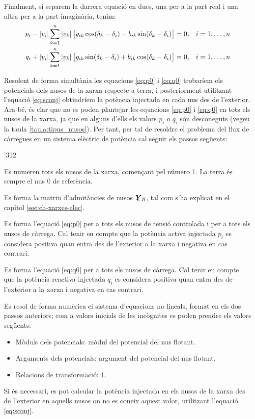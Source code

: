 Finalment, si separem la darrera equació en dues, una per a  la part real i  una altra per
a la part imaginària, tenim:
\begin{align}
    p_i - |\cmplx{v}_i| \sum^n_{k=1}  |\cmplx{v}_k|\, \bigl[ g_{ik} \cos(\delta_k - \delta_i) -
     b_{ik} \sin(\delta_k - \delta_i) \bigr] &= 0,  & i&=1,\ldots,n\label{eq:p0} \\
    q_i + |\cmplx{v}_i| \sum^n_{k=1}  |\cmplx{v}_k| \,\bigl[ g_{ik} \sin(\delta_k - \delta_i) +
      b_{ik} \cos(\delta_k - \delta_i) \bigr] &= 0, & i&=1,\ldots,n\label{eq:q0}
\end{align}

Resolent de forma simultània les equacions \eqref{eq:p0} i
\eqref{eq:q0} trobaríem els potencials dels nusos de la xarxa
respecte a  terra, i posteriorment utilitzant l'equació
\eqref{eq:sconj} obtindríem la potència injectada en cada nus des
de l'exterior. Ara bé, és clar que no es poden plantejar les
equacions \eqref{eq:p0} i \eqref{eq:q0} en tots els nusos de la
xarxa, ja que en alguns d'ells els valors $p_i$ o $q_i$ són
desconeguts (vegeu la taula \vref{taula:tipus_nusos}). Per tant, per
tal de resoldre el problema del flux de càrregues en un sistema
elèctric de potència cal seguir els passos següents:
\begin{dingautolist}{'312}
    \item Es numeren tots els nusos de la xarxa, començant pel número 1. La terra és sempre el nus 0 de referència.
   \item Es forma la matriu d'admitàncies de nusos $\mcmplx{Y}\ped{N}$, tal com s'ha
   explicat en el capítol \ref{sec:ch-xarxes-elec}.
   \item Es forma l'equació \eqref{eq:p0} per a tots els nusos de tensió controlada i per
   a tots els nusos de càrrega. Cal tenir en compte que la potència activa  injectada $p_i$ es considera
   positiva quan entra des de l'exterior a la xarxa i negativa en cas contrari.
   \item Es forma l'equació \eqref{eq:q0} per a tots els nusos de càrrega. Cal tenir en compte
   que la potència reactiva injectada $q_i$  es considera positiva quan entra des de l'exterior a la xarxa i negativa en cas contrari.
   \item Es resol de forma numèrica el sistema d'equacions no lineals, format en els dos
   passos anteriors; com a valors inicials de les incògnites es poden prendre els valors
   següents:
   \begin{itemize}
    \item Mòduls dels potencials: mòdul del potencial del nus flotant.
    \item Arguments dels potencials: argument del potencial del nus flotant.
    \item Relacions de transformació: 1.
   \end{itemize}
   \item Si és necessari,  es pot calcular la potència injectada en els nusos de la xarxa
   des de l'exterior en aquells nusos on no es
   coneix aquest valor, utilitzant    l'equació \eqref{eq:sconj}.
\end{dingautolist}


